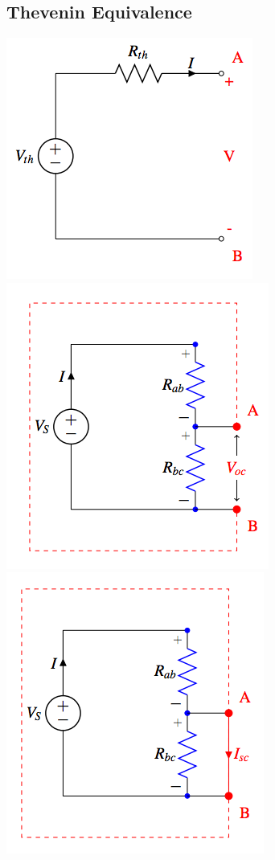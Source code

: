 \documentclass{article}\usepackage{amsmath,amssymb,amsthm,tikz,tkz-graph,color,chngpage,soul,hyperref,csquotes,graphicx,floatrow}\newcommand*{\QEDB}{\hfill\ensuremath{\square}}\newtheorem*{prop}{Proposition}\renewcommand{\theenumi}{\alph{enumi}}\usepackage[shortlabels]{enumitem}\usepackage[nobreak=true]{mdframed}\usetikzlibrary{matrix,calc}\MakeOuterQuote{"}\usepackage[margin=0.75in]{geometry} \newtheorem{theorem}{Theorem}
\begin{document}
\subsection*{Thevenin Equivalence}
\begin{center}\includegraphics{thev}\includegraphics{th_voc}\includegraphics{th_isc}\end{center}
\end{document}
